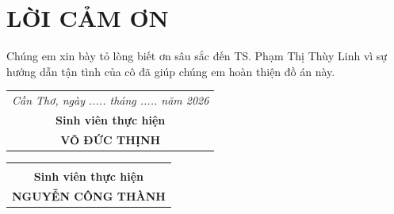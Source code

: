 \chapter*{LỜI CẢM ƠN}
\vspace{-15pt} 

Chúng em xin bày tỏ lòng biết ơn sâu sắc đến TS. Phạm Thị Thùy Linh vì sự hướng dẫn tận tình của cô đã giúp chúng em hoàn thiện đồ án này.

\vfill 

\noindent
\vfill
\begin{tabular}{@{}c@{}}
    \textit{Cần Thơ, ngày ..... tháng ..... năm 2026} \\[0.2cm]
    \textbf{Sinh viên thực hiện} \\[2cm] 
    \textbf{VÕ ĐỨC THỊNH}
\end{tabular}
\begin{tabular}{@{}c@{}}
    \textit{ } \\[0.2cm]
    \textbf{Sinh viên thực hiện} \\[2cm] 
    \textbf{NGUYỄN CÔNG THÀNH}
\end{tabular}
